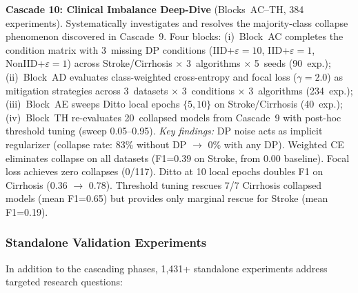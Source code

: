 \documentclass[conference]{IEEEtran}
\begin{document}
\smallskip\noindent\textbf{Cascade 10: Clinical Imbalance Deep-Dive} (Blocks~AC--TH, 384 experiments). Systematically investigates and resolves the majority-class collapse phenomenon discovered in Cascade~9. Four blocks: (i)~Block~AC completes the condition matrix with 3~missing DP conditions (IID+$\varepsilon{=}10$, IID+$\varepsilon{=}1$, NonIID+$\varepsilon{=}1$) across Stroke/Cirrhosis $\times$ 3~algorithms $\times$ 5~seeds (90~exp.); (ii)~Block~AD evaluates class-weighted cross-entropy and focal loss ($\gamma{=}2.0$) as mitigation strategies across 3~datasets $\times$ 3~conditions $\times$ 3~algorithms (234~exp.); (iii)~Block~AE sweeps Ditto local epochs $\{5, 10\}$ on Stroke/Cirrhosis (40~exp.); (iv)~Block~TH re-evaluates 20~collapsed models from Cascade~9 with post-hoc threshold tuning (sweep 0.05--0.95). \textit{Key findings:} DP noise acts as implicit regularizer (collapse rate: 83\% without DP $\to$ 0\% with any DP). Weighted CE eliminates collapse on all datasets (F1=0.39 on Stroke, from 0.00 baseline). Focal loss achieves zero collapses (0/117). Ditto at 10 local epochs doubles F1 on Cirrhosis (0.36 $\to$ 0.78). Threshold tuning rescues 7/7 Cirrhosis collapsed models (mean F1=0.65) but provides only marginal rescue for Stroke (mean F1=0.19).

\subsubsection{Standalone Validation Experiments}

In addition to the cascading phases, 1,431+ standalone experiments address targeted research questions:
\end{document}
